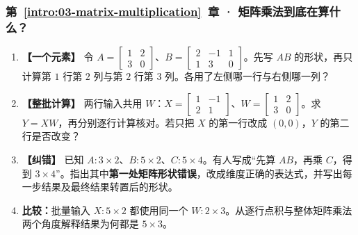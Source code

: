 \subsubsection*{第~\ref*{intro:03-matrix-multiplication}~章 · 矩阵乘法到底在算什么？}
\begin{enumerate}[label={},leftmargin=4.8em,itemsep=4pt]
\item[\textbf{C-028.}] \leavevmode{}\label{exercise:C-028}\label{exercise:matrix-single-entry}\textbf{【一个元素】} 令 $A=\begin{bmatrix}1&2\\3&0\end{bmatrix}$、$B=\begin{bmatrix}2&-1&1\\1&3&0\end{bmatrix}$。先写 $AB$ 的形状，再只计算第 $1$ 行第 $2$ 列与第 $2$ 行第 $3$ 列。各用了左侧哪一行与右侧哪一列？
\item[\textbf{C-029.}] \leavevmode{}\label{exercise:C-029}\label{exercise:matrix-batch-calculation}\textbf{【整批计算】} 两行输入共用 $W$：$X=\begin{bmatrix}1&-1\\2&1\end{bmatrix}$、$W=\begin{bmatrix}1&2\\3&0\end{bmatrix}$。求 $Y=XW$，再分别逐行计算核对。若只把 $X$ 的第一行改成 $(0,0)$，$Y$ 的第二行是否改变？
\item[\textbf{C-030.}] \leavevmode{}\label{exercise:C-030}\label{exercise:matrix-shape-correction}\textbf{【纠错】} 已知 $A:3\times2$、$B:5\times2$、$C:5\times4$。有人写成“先算 $AB$，再乘 $C$，得到 $3\times4$”。指出其中\textbf{第一处矩阵形状错误}，改成维度正确的表达式，并写出每一步结果及最终结果转置后的形状。
\item[\textbf{C-031.}] \leavevmode{}\label{exercise:C-031}\label{exercise:batch-matrix-sharing}\textbf{比较：}批量输入 $X:5\times2$ 都使用同一个 $W:2\times3$。从逐行点积与整体矩阵乘法两个角度解释结果为何都是 $5\times3$。

\end{enumerate}
